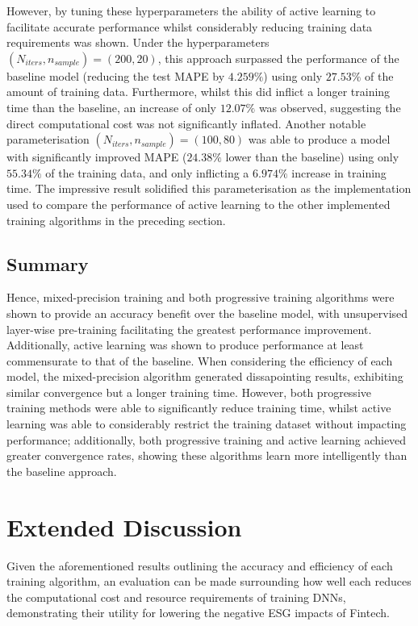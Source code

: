 \documentclass[a4paper, 11pt]{report}
\begin{document}
    However, by tuning these hyperparameters the ability of active learning to facilitate accurate performance whilst considerably reducing training data requirements was shown. Under the hyperparameters $(N_{iters}, n_{sample}) = (200, 20)$, this approach surpassed the performance of the baseline model (reducing the test MAPE by $4.259\%$) using only $27.53\%$ of the amount of training data. Furthermore, whilst this did inflict a longer training time than the baseline, an increase of only $12.07\%$ was observed, suggesting the direct computational cost was not significantly inflated. Another notable parameterisation $(N_{iters}, n_{sample}) = (100, 80)$ was able to produce a model with significantly improved MAPE ($24.38\%$ lower than the baseline) using only $55.34\%$ of the training data, and only inflicting a $6.974\%$ increase in training time. The impressive result solidified this parameterisation as the implementation used to compare the performance of active learning to the other implemented training algorithms in the preceding section.


    \subsection{Summary}

    Hence, mixed-precision training and both progressive training algorithms were shown to provide an accuracy benefit over the baseline model, with unsupervised layer-wise pre-training facilitating the greatest performance improvement. Additionally, active learning was shown to produce performance at least commensurate to that of the baseline. When considering the efficiency of each model, the mixed-precision algorithm generated dissapointing results, exhibiting similar convergence but a longer training time. However, both progressive training methods were able to significantly reduce training time, whilst active learning was able to considerably restrict the training dataset without impacting performance; additionally, both progressive training and active learning achieved greater convergence rates, showing these algorithms learn more intelligently than the baseline approach.


    \section{Extended Discussion}

    Given the aforementioned results outlining the accuracy and efficiency of each training algorithm, an evaluation can be made surrounding how well each reduces the computational cost and resource requirements of training DNNs, demonstrating their utility for lowering the negative ESG impacts of Fintech.
\end{document}
